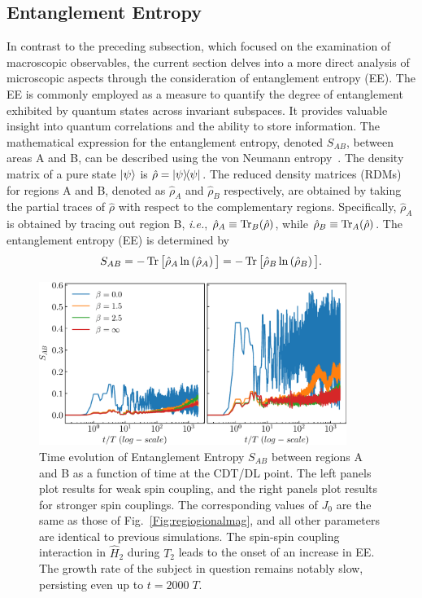 \documentclass[12pt]{iopart}
\begin{document}
	\subsection{\label{sec:level41} Entanglement Entropy}
In contrast to the preceding subsection, which focused on the examination of macroscopic observables, the current section delves into a more direct analysis of microscopic aspects through the consideration of entanglement entropy (EE). The EE is commonly employed as a measure to quantify the degree of entanglement exhibited by quantum states across invariant subspaces. It provides valuable insight into quantum correlations and the ability to store information. The mathematical expression for the entanglement entropy, denoted $S_{AB}$, between areas A and B, can be described using the von Neumann entropy~\cite{bayat_entanglement_2022,mendes-santos_measuring_2020}.   The density matrix of a pure state $\ket{\psi}$ is $\hat{\rho}= \ketbra{\psi}$. The reduced density matrices (RDMs) for regions A and B, denoted as $\hat{\rho}_A$ and $\hat{\rho}_B$ respectively, are obtained by taking the partial traces of $\hat{\rho}$ with respect to the complementary regions. Specifically, $\hat{\rho}_A$ is obtained by tracing out region B, \textit{i.e.}, $\hat{\rho}_A\equiv \mathop{\mathrm{Tr}}\nolimits_B(\hat{\rho})$, while $\hat{\rho}_B\equiv\mathop{\mathrm{Tr}}\nolimits_A(\hat{\rho})$. The entanglement entropy (EE) is determined by
\begin{equation} 
    S_{AB} = -\mathop{\mathrm{Tr}}\nolimits\big[\hat{\rho}_A \ln\left(\hat{\rho}_A\right)\big] = -\mathop{\mathrm{Tr}}\nolimits\big[\hat{\rho}_B \ln\left(\hat{\rho}_B\right)\big].
    \label{eq:vonentrop}
\end{equation}	
\begin{figure}
    \begin{center}
        \includegraphics[width=10cm]{entangEntrp.pdf}
    \end{center}
    \caption{Time evolution of Entanglement Entropy $S_{AB}$ between regions A and B as a function of time at the CDT/DL point. The left panels plot results for weak spin coupling, and the right panels plot results for stronger spin couplings. The corresponding values of $J_0$ are the same as those of Fig.~\ref{Fig:regiogionalmag}, and all other parameters are identical to previous simulations. The spin-spin coupling interaction in $\hat{H}_2$ during $T_2$ leads to the onset of an increase in EE. The growth rate of the subject in question remains notably slow, persisting even up to $t=2000\;T$.}
    \label{Fig:entangle}
\end{figure}
\end{document}
